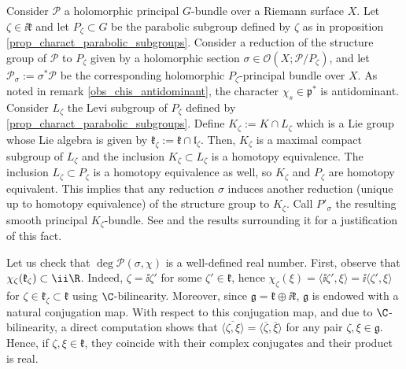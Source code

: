 {Consider \(\mathcal{P}\) a holomorphic principal \(G\)-bundle over a Riemann surface \(X\). Let \(\zeta \in \ii \mathfrak{k}\) and let \(P_\zeta\subset G\) be the parabolic subgroup defined by \(\zeta\) as in proposition \ref{prop_charact_parabolic_subgroups}. Consider a reduction of the structure group of \(\mathcal{P}\) to \(P_\zeta\) given by a holomorphic section \(\sigma \in \mathcal{O}(X; \mathcal{P}/P_\zeta)\), and let \(\mathcal{P}_\sigma:=\sigma^*\mathcal{P}\) be the corresponding holomorphic \(P_\zeta\)-principal bundle over \(X\). As noted in remark \ref{obs_chis_antidominant}, the character \(\chi_s\in \mathfrak{p}^*\) is antidominant. Consider \(L_\zeta\) the Levi subgroup of \(P_\zeta\) defined by \ref{prop_charact_parabolic_subgroups}. Define \(K_\zeta:=K\cap L_\zeta\) which is a Lie group whose Lie algebra is given by \(\mathfrak{k}_\zeta:=\mathfrak{k}\cap \mathfrak{l}_\zeta\).  Then, \(K_\zeta\) is a maximal compact subgroup of \(L_\zeta\) and the inclusion \(K_\zeta \subset L_\zeta\) is a homotopy equivalence. The inclusion \(L_\zeta\subset P_\zeta\) is a homotopy equivalence as well, so \(K_\zeta\) and \(P_\zeta\) are homotopy equivalent. This implies that any reduction \(\sigma\) induces another reduction (unique up to homotopy equivalence) of the structure group to \(K_\zeta\). Call \(P'_\sigma\) the resulting smooth principal \(K_\zeta\)-bundle. See \parencite[Example 5.6]{kobayashi_vol1} and the results surrounding it for a justification of this fact.

\begin{obs} \label{obs_deg_well_defined}
    Let us check that \(\deg \mathcal{P}(\sigma, \chi)\) is a well-defined real number. First, observe that \(\chi_\zeta(\mathfrak{k}_\zeta) \subset \ii \R\). Indeed, \(\zeta=\ii \zeta'\) for some \(\zeta' \in \mathfrak{k}\), hence \(\chi_\zeta(\xi)=\langle \ii \zeta', \xi \rangle = \ii \langle \zeta', \xi \rangle\) for \(\zeta \in \mathfrak{k}_\zeta \subset \mathfrak{k}\) using \(\C\)-bilinearity. Moreover, since \(\mathfrak{g}=\mathfrak{k}\oplus \ii \mathfrak{k}\), \(\mathfrak{g}\) is endowed with a natural conjugation map. With respect to this conjugation map, and due to \(\C\)-bilinearity, a direct computation shows that \(\overline{\langle \zeta, \xi \rangle} = \langle \overline{\zeta}, \overline{\xi} \rangle\) for any pair \(\zeta, \xi \in \mathfrak{g}\). Hence, if \(\zeta, \xi \in \mathfrak{k}\), they coincide with their complex conjugates and their product is real. \\


\end{obs}}
